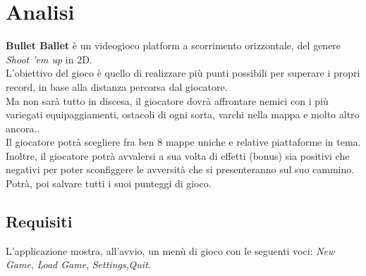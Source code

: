 
\chapter{Analisi}

\textsf{\small \textbf{Bullet Ballet} è un videogioco platform a scorrimento orizzontale, del genere \emph{Shoot 'em up} in 2D.}\\
\textsf{\small L'obiettivo del gioco è quello di realizzare più punti possibili per superare i propri record, in base alla distanza percorsa dal giocatore.}\\

\textsf{\small Ma non sarà tutto in discesa, il giocatore dovrà affrontare nemici con i più variegati equipaggiamenti, ostacoli di ogni sorta, varchi nella mappa e molto altro ancora..}\\
\textsf{\small Il giocatore potrà scegliere fra ben 8 mappe uniche e relative piattaforme in tema.}\\

\textsf{\small Inoltre, il giocatore potrà avvalersi a sua volta di effetti (bonus) sia positivi che negativi per poter sconfiggere le avversità che si presenteranno sul suo cammino.}\\

\textsf{\small Potrà, poi salvare tutti i suoi punteggi di gioco.}\\

\section{Requisiti}

\textsf{\small L'applicazione mostra, all'avvio, un menù di gioco con le seguenti voci: \emph{New Game}, \emph{Load Game}, \emph{Settings},\emph{Quit}.}\\

